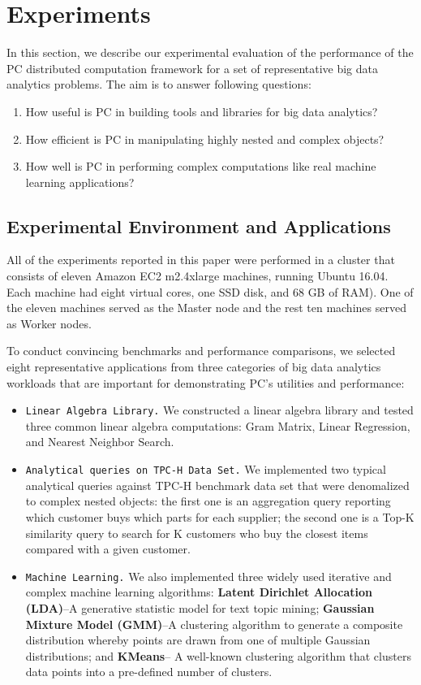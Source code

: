 
\section{Experiments}

In this section, we describe our experimental evaluation of the
performance of the PC distributed computation framework for a set of
representative big data analytics problems. The aim is to answer
following questions:

\begin {enumerate}
\item How useful is PC in building tools and libraries for big data analytics?
\item How efficient is PC in manipulating highly nested and complex objects?
\item How well is PC in performing complex computations like real
  machine learning applications?
\end {enumerate}

\subsection {Experimental Environment and Applications}

All of the experiments reported in this paper were performed in a
cluster that consists of eleven Amazon EC2 m2.4xlarge machines,
running Ubuntu 16.04. Each machine had eight virtual cores, one SSD
disk, and 68 GB of RAM). One of the eleven machines served as the Master
node and the rest ten machines served as Worker nodes.

\vspace{5pt}
To conduct convincing benchmarks and performance comparisons, we
selected eight representative applications from three categories
of big data analytics workloads that are important for demonstrating
PC's utilities and performance:

\begin {itemize}
\item \texttt{Linear Algebra Library.} We constructed a linear algebra library
  and tested three common linear algebra computations: Gram Matrix,
  Linear Regression, and Nearest Neighbor Search.
\item \texttt{Analytical queries on TPC-H Data
    Set.}  We implemented two typical analytical queries against TPC-H
  benchmark data set that were denomalized to complex nested objects: the first one is an aggregation query reporting which customer buys which
  parts for each supplier; the second one is a Top-K similarity query
  to search for K customers who buy the closest items compared with a
  given customer.
\item \texttt{Machine Learning.} We also implemented three widely used
  iterative and complex machine learning algorithms: \textbf{Latent Dirichlet Allocation (LDA)}--A
  generative statistic model for text topic mining;
  \textbf{Gaussian Mixture Model (GMM)}--A clustering algorithm to generate a composite
  distribution whereby points are drawn from one of multiple Gaussian distributions;  and \textbf{KMeans}-- A well-known clustering algorithm that clusters
  data points into a pre-defined number of clusters.
\end {itemize}

